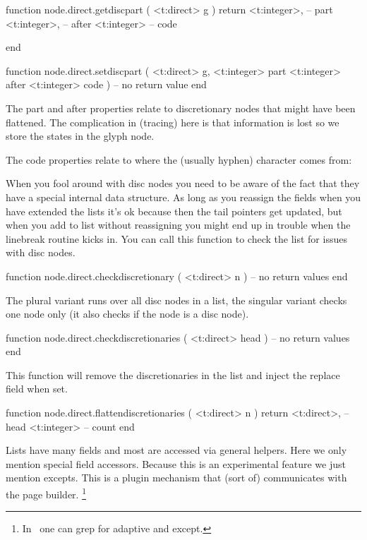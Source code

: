 \starttyping[option=LUA]
function node.direct.getdiscpart ( <t:direct> g )
    return
        <t:integer>, -- part
        <t:integer>, -- after
        <t:integer>  -- code

end

function node.direct.setdiscpart (
    <t:direct>  g,
    <t:integer> part
    <t:integer> after
    <t:integer> code
)
    -- no return value
end
\stoptyping

The part and after properties relate to discretionary nodes that might have been
flattened. The complication in (tracing) here is that information is lost so we
store the states in the glyph node.


The code properties relate to where the (usually hyphen) character comes from:


When you fool around with disc nodes you need to be aware of the fact that they
have a special internal data structure. As long as you reassign the fields when
you have extended the lists it's ok because then the tail pointers get updated,
but when you add to list without reassigning you might end up in trouble when
the linebreak routine kicks in. You can call this function to check the list for
issues with disc nodes.

\starttyping[option=LUA]
function node.direct.checkdiscretionary ( <t:direct> n )
    -- no return values
end
\stoptyping

The plural variant runs over all disc nodes in a list, the singular variant
checks one node only (it also checks if the node is a disc node).

\starttyping[option=LUA]
function node.direct.checkdiscretionaries ( <t:direct> head )
    -- no return values
end
\stoptyping

This function will remove the discretionaries in the list and inject the replace
field when set.

\starttyping[option=LUA]
function node.direct.flattendiscretionaries ( <t:direct> n )
    return
        <t:direct>, -- head
        <t:integer> -- count
end
\stoptyping

\stopsubsection

\startsubsection[title={Boxes}]

Lists have many fields and most are accessed via general helpers. Here we only
mention special field accessors. Because this is an experimental feature we just
mention excepts. This is a plugin mechanism that (sort of) communicates with the
page builder. \footnote {In \CONTEXT\ one can grep for adaptive and except.}

